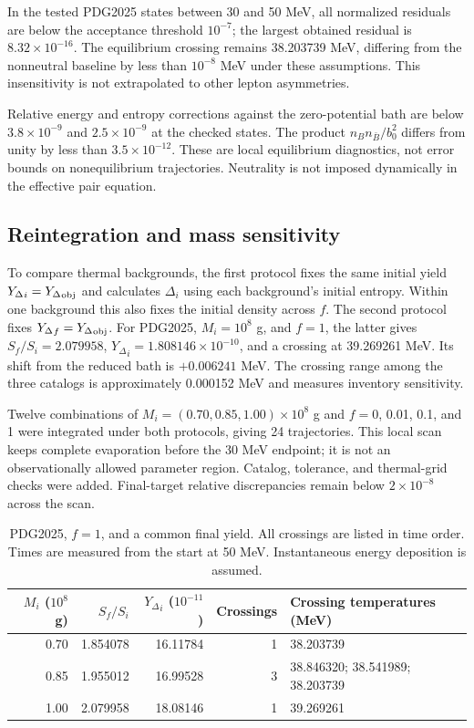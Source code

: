 \documentclass[10pt,a4paper,twocolumn]{article}
\newcommand{\Y}{{Y_\Delta}}
\begin{document}
In the tested PDG2025 states between 30 and 50 MeV, all normalized residuals are below the acceptance threshold $10^{-7}$; the largest obtained residual is $8.32\times10^{-16}$. The equilibrium crossing remains 38.203739 MeV, differing from the nonneutral baseline by less than $10^{-8}$ MeV under these assumptions. This insensitivity is not extrapolated to other lepton asymmetries.

Relative energy and entropy corrections against the zero-potential bath are below $3.8\times10^{-9}$ and $2.5\times10^{-9}$ at the checked states. The product $n_Bn_{\bar B}/b_0^2$ differs from unity by less than $3.5\times10^{-12}$. These are local equilibrium diagnostics, not error bounds on nonequilibrium trajectories. Neutrality is not imposed dynamically in the effective pair equation.

\subsection{Reintegration and mass sensitivity}
To compare thermal backgrounds, the first protocol fixes the same initial yield $\Y_i=\Y_{\rm obj}$ and calculates $\Delta_i$ using each background's initial entropy. Within one background this also fixes the initial density across $f$. The second protocol fixes $\Y_f=\Y_{\rm obj}$. For PDG2025, $M_i=10^8$ g, and $f=1$, the latter gives $S_f/S_i=2.079958$, $\Y_i=1.808146\times10^{-10}$, and a crossing at 39.269261 MeV. Its shift from the reduced bath is $+0.006241$ MeV. The crossing range among the three catalogs is approximately 0.000152 MeV and measures inventory sensitivity.

Twelve combinations of $M_i=(0.70,0.85,1.00)\times10^8$ g and $f=0$, 0.01, 0.1, and 1 were integrated under both protocols, giving 24 trajectories. This local scan keeps complete evaporation before the 30 MeV endpoint; it is not an observationally allowed parameter region. Catalog, tolerance, and thermal-grid checks were added. Final-target relative discrepancies remain below $2\times10^{-8}$ across the scan.

\begin{table}[t]
\centering\small
\caption{PDG2025, $f=1$, and a common final yield. All crossings are listed in time order. Times are measured from the start at 50 MeV. Instantaneous energy deposition is assumed.}\label{tab:mass}
\begin{tabular}{rrrrl}\toprule
$M_i$ ($10^8$ g)&$S_f/S_i$&$\Y_i$ ($10^{-11}$)&Crossings&Crossing temperatures (MeV)\\\midrule
0.70&1.854078&16.11784&1&38.203739\\
0.85&1.955012&16.99528&3&38.846320; 38.541989; 38.203739\\
1.00&2.079958&18.08146&1&39.269261\\\bottomrule
\end{tabular}
\end{table}
\end{document}
